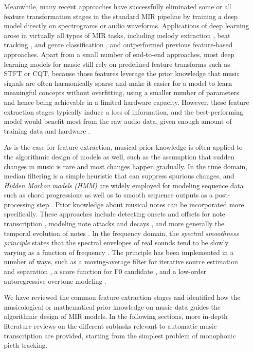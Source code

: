 Meanwhile, many recent approaches have successfully eliminated some or all feature transformation stages in the standard MIR pipeline by training a deep model directly on spectrograms or audio waveforms.
Applications of deep learning arose in virtually all types of MIR tasks, including melody extraction \cite{bittner2017deepsalience}, beat tracking \cite{vogl2017drum}, and genre classification \cite{oramas2017genre}, and outperformed previous feature-based approaches.
Apart from a small number of end-to-end approaches, most deep learning models for music still rely on predefined feature transforms such as STFT or CQT, because those features leverage the prior knowledge that music signals are often harmonically sparse and make it easier for a model to learn meaningful concepts without overfitting, using a smaller number of parameters and hence being achievable in a limited hardware capacity.
However, these feature extraction stages typically induce a loss of information, and the best-performing model would benefit most from the raw audio data, given enough amount of training data and hardware \cite{pons2018tagging}.


As is the case for feature extraction, musical prior knowledge is often applied to the algorithmic design of models as well, such as the assumption that sudden changes in music is rare and most changes happen gradually.
In the time domain, median filtering \cite{oudre2009chord} is a simple heuristic that can suppress spurious changes, and \textit{Hidden Markov models (HMM)} are widely employed for modeling sequence data such as chord progressions \cite{cho2010chord} as well as to smooth sequence outputs as a post-processing step \cite{khadkevich2009hmm}.
Prior knowledge about musical notes can be incorporated more specifically. These approaches include detecting onsets and offsets for note transcription \cite{benetos2011polyphonic}, modeling note attacks and decays \cite{cheng2016attackdecay}, and more generally the temporal evolution of notes \cite{cogliati2015temporal}.
In the frequency domain, the \textit{spectral smoothness principle} states that the spectral envelopes of real sounds tend to be slowly varying as a function of frequency \cite{klapuri2003multiple}.
The principle has been implemented in a number of ways, such as a moving-average filter for iterative source estimation and separation \cite{klapuri2003multiple}, a score function for F0 candidate \cite{yeh2010mffe}, and a low-order autoregressive overtone modeling \cite{emiya2010smoothness}.

We have reviewed the common feature extraction stages and identified how the musicological or mathematical prior knowledge on music data guides the algorithmic design of MIR models.
In the following sections, more in-depth literature reviews on the different subtasks relevant to automatic music transcription are provided, starting from the simplest problem of monophonic picth tracking.


